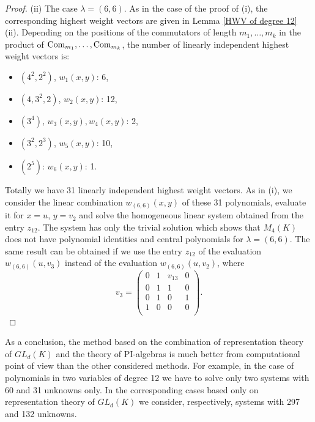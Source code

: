 \documentclass[12pt]{amsart}
\theoremstyle{definition}
\begin{document}
\begin{proof}
(ii) The case $\lambda=(6,6)$. As in the case of the proof of (i), the corresponding highest weight vectors are given in Lemma \ref{HWV of degree 12} (ii).
Depending on the positions of the commutators of length $m_1,\ldots,m_k$ in the product of $\text{\rm Com}_{m_1},\ldots,\text{\rm Com}_{m_k}$,
the number of linearly independent highest weight vectors is:
\begin{itemize}
\item $(4^2,2^2)$, $w_1(x,y)$: 6,
\item $(4,3^2,2)$, $w_2(x,y)$: 12,
\item $(3^4)$, $w_3(x,y),w_4(x,y)$: 2,
\item $(3^2,2^3)$, $w_5(x,y)$: 10,
\item $(2^5)$: $w_6(x,y)$: 1.
\end{itemize}
Totally we have 31 linearly independent highest weight vectors. As in (i), we consider the linear combination $w_{(6,6)}(x,y)$ of these 31 polynomials,
evaluate it for $x=u$, $y=v_2$ and solve the homogeneous linear system obtained from the entry $z_{12}$. The system has only the trivial solution which shows
that $M_4(K)$ does not have polynomial identities and central polynomials for $\lambda=(6,6)$.
The same result can be obtained if we use the entry $z_{12}$ of the evaluation $w_{(6,6)}(u,v_3)$ instead of the evaluation $w_{(6,6)}(u,v_2)$, where
\[
v_3=\left(\begin{matrix}0&1&v_{13}&0\\
0&1&1&0\\
0&1&0&1\\
1&0&0&0\\
\end{matrix}\right).
\]
\end{proof}

As a conclusion, the method based on the combination of representation theory of $GL_d(K)$ and the theory of PI-algebras
is much better from computational point of view than the other considered methods. For example, in the case of polynomials in two variables of degree 12
we have to solve only two systems with 60 and 31 unknowns only. In the corresponding cases based only on representation theory of $GL_d(K)$
we consider, respectively, systems with 297 and 132 unknowns.
\end{document}
